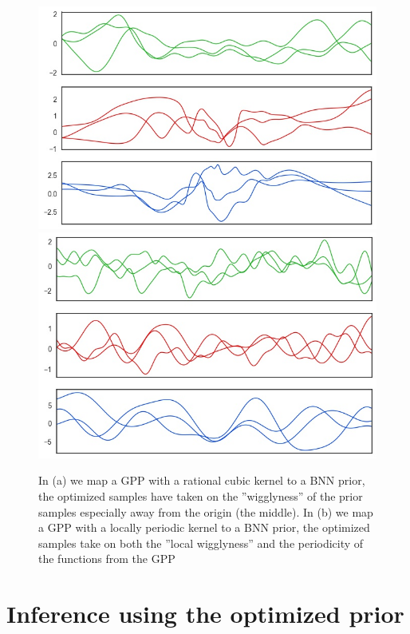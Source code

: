 \documentclass{article}
\begin{document}
\begin{figure}[h]\centering
{
\includegraphics[width=.45\textwidth]{figs/rqrbf}
}
{
\includegraphics[width=.45\textwidth]{figs/perrfbsin1}
}
\caption{In (a) we map a GPP with a rational cubic kernel to a BNN prior, the optimized samples have taken on 
the ''wigglyness'' of the prior samples especially away from the origin (the middle).
 In (b) we map a GPP with a locally periodic kernel to a BNN prior, the optimized samples take on both 
 the ''local wigglyness'' and the periodicity of the functions from the GPP} \label{fig:1}
\end{figure}


\section{Inference using the optimized prior}
\end{document}
